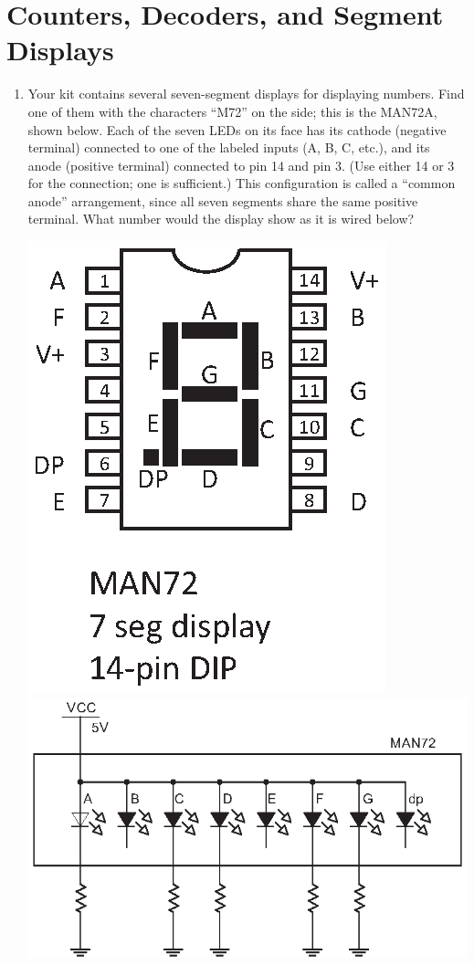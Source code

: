 \section{Counters, Decoders, and Segment Displays}
\label{lab_counters}


\bigskip

\begin{enumerate}[wide]

\item Your kit contains several seven-segment displays for displaying numbers.  Find one of them with the characters ``M72'' on the side; this is the MAN72A, shown below.  Each of the seven LEDs on its face has its cathode (negative terminal) connected to one of the labeled inputs (A, B, C, etc.), and its anode (positive terminal) connected to pin 14 and pin 3.  (Use either 14 or 3 for the connection; one is sufficient.) This configuration is called a ``common anode'' arrangement, since all seven segments share the same positive terminal.  What number would the display show as it is wired below? 
\begin{center}
\includegraphics[scale=0.8]{appendices/pinouts/man72.eps}
\includegraphics{counters/man72_circuit.eps}

\end{center}
\end{enumerate}
